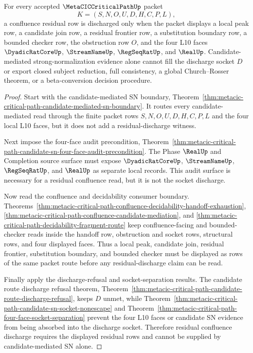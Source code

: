 \begin{theorem}
\label{thm:metacic-critical-path-confluence-residual-discharge}
For every accepted $\MetaCICCriticalPathUp$ packet
$$
K=(S,N,O,U,D,H,C,P,L),
$$
a confluence residual row is discharged only when the packet displays a local peak row, a candidate join row, a residual frontier row, a substitution boundary row, a bounded checker row, the obstruction row $O$, and the four L10 faces $\DyadicRatCoreUp$, $\StreamNameUp$, $\RegSeqRatUp$, and $\RealUp$. Candidate-mediated strong-normalization evidence alone cannot fill the discharge socket $D$ or export closed subject reduction, full consistency, a global Church--Rosser theorem, or a beta-conversion decision procedure.
\end{theorem}
\begin{proof}
Start with the candidate-mediated SN boundary, Theorem~\ref{thm:metacic-critical-path-candidate-mediated-sn-boundary}. It routes every candidate-mediated read through the finite packet rows $S,N,O,U,D,H,C,P,L$ and the four local L10 faces, but it does not add a residual-discharge witness.

Next impose the four-face audit precondition, Theorem~\ref{thm:metacic-critical-path-candidate-sn-four-face-audit-precondition}. The Phase $\RealUp$ and Completion source surface must expose $\DyadicRatCoreUp$, $\StreamNameUp$, $\RegSeqRatUp$, and $\RealUp$ as separate local records. This audit surface is necessary for a residual confluence read, but it is not the socket discharge.

Now read the confluence and decidability consumer boundary. Theorems~\ref{thm:metacic-critical-path-confluence-decidability-handoff-exhaustion}, \ref{thm:metacic-critical-path-confluence-candidate-mediation}, and \ref{thm:metacic-critical-path-decidability-fragment-route} keep confluence-facing and bounded-checker reads inside the handoff row, obstruction and socket rows, structural rows, and four displayed faces. Thus a local peak, candidate join, residual frontier, substitution boundary, and bounded checker must be displayed as rows of the same packet route before any residual-discharge claim can be read.

Finally apply the discharge-refusal and socket-separation results. The candidate route discharge refusal theorem, Theorem~\ref{thm:metacic-critical-path-candidate-route-discharge-refusal}, keeps $D$ unmet, while Theorem~\ref{thm:metacic-critical-path-candidate-sn-socket-nonescape} and Theorem~\ref{thm:metacic-critical-path-four-face-socket-separation} prevent the four L10 faces or candidate SN evidence from being absorbed into the discharge socket. Therefore residual confluence discharge requires the displayed residual rows and cannot be supplied by candidate-mediated SN alone.
\end{proof}

